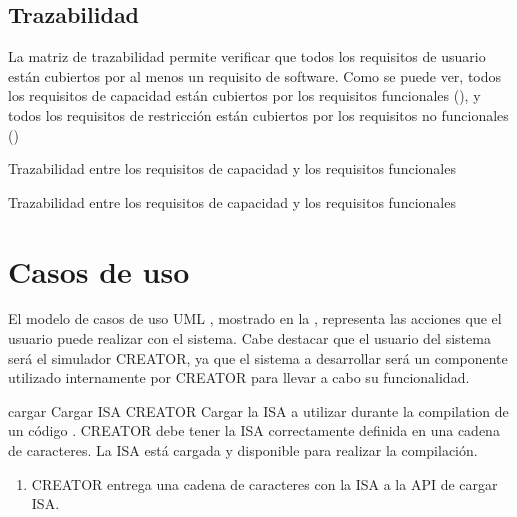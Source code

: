 \subsection{Trazabilidad}\label{subsec:trazability}

La matriz de trazabilidad permite verificar que todos los requisitos de usuario
están cubiertos por al menos un requisito de software. Como se puede ver, todos
los requisitos de capacidad están cubiertos por los requisitos funcionales
(), y todos los requisitos de restricción están
cubiertos por los requisitos no funcionales ()

    {Trazabilidad entre los requisitos de capacidad y los requisitos funcionales}

    {Trazabilidad entre los requisitos de capacidad y los requisitos funcionales}

\FloatBarrier

\section{Casos de uso}\label{sec:usecases}

El modelo de casos de uso UML \parencite{UMLSpec}, mostrado en la
, representa las acciones que el usuario puede realizar con
el sistema. Cabe destacar que el usuario del sistema será el simulador CREATOR,
ya que el sistema a desarrollar será un componente utilizado internamente por
CREATOR para llevar a cabo su funcionalidad.


\printuctemplate

\begin{useCase}{cargar}
    {Cargar \gls{ISA}} %
    {CREATOR} %
    {Cargar la \gls{ISA} a utilizar durante la \gls{compilation} de un código .} %
    {CREATOR debe tener la \gls{ISA} correctamente definida en una cadena de caracteres.} %
    {La \gls{ISA} está cargada y disponible para realizar la compilación.} %
    \begin{enumerate}[leftmargin=*, topsep=0pt, noitemsep]
        \item CREATOR entrega una cadena de caracteres con la
        \gls{ISA} a la \gls{API} de cargar \gls{ISA}.
    \end{enumerate}
\end{useCase}

